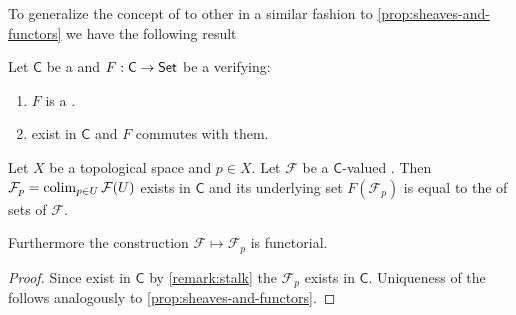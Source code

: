 \documentclass[../main.tex]{subfiles}
\begin{document}
To generalize the concept of  to other  in a similar fashion to \autoref{prop:sheaves-and-functors} we have the following result
\begin{proposition}
  Let \(\mathsf{C}\) be a  and \(F: \mathsf{C} \to \mathsf{Set}\) be a  verifying:
  \begin{enumerate}
    \item \(F\) is a .
    \item {} exist in \(\mathsf{C}\) and \(F\) commutes with them.
  \end{enumerate}
  Let \(X\) be a topological space and \(p \in X\). Let \(\mathcal{F}\) be a \(\mathsf{C}\)-valued .
  Then \(\mathcal{F}_{p} = \operatorname*{colim}_{p \in U} \mathcal{F}(U)\) exists in \(\mathsf{C}\) and its underlying set \(F(\mathcal{F}_{p})\) is equal to the  of sets of \(\mathcal{F}\).

  Furthermore the construction \(\mathcal{F} \mapsto \mathcal{F}_{p}\) is functorial.
\end{proposition}
\begin{proof}
  Since  exist in \(\mathsf{C}\) by \autoref{remark:stalk} the  \(\mathcal{F}_{p}\) exists in \(\mathsf{C}\).
  Uniqueness of the  follows analogously to \autoref{prop:sheaves-and-functors}.
\end{proof}
\end{document}

